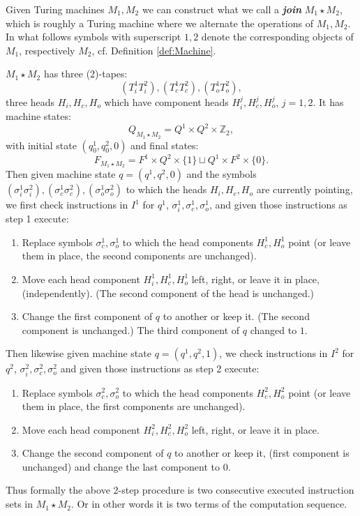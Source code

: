 \documentclass[9pt,twocolumn,twoside,lineno]{pnas-new}
\numberwithin{equation}{section}
\theoremstyle{definition}
\theoremstyle{remark}
\begin{document}
Given Turing machines $M _{1}, M _{2}  $ we can construct what we call a \textbf{\emph{join}} $M _{1} \star M _{2}  $, which is roughly  a Turing machine where we alternate the operations of $M _{1}, M  _{2}  $. In what follows symbols with superscript $1,2$ denote the corresponding objects of $M _{1} $, respectively $M _{2} $, cf. Definition \ref{def:Machine}. 
 

$M _{1} \star M _{2}  $ has three (2)-tapes: $$(T ^{{1} } _{i}  T ^{{2} } _{i}),    (T ^{{1} } _{c}  T ^{{2} } _{c}  ), (T ^{{1} } _{o}  T ^{2}  _{o} ),   $$ three heads $H _{i}, H _{c}, H _{o}   $ which have component heads $H ^{j} _{i}, H ^{j} _{c}, H ^{j} _{o}      $, $j=1,2$. It has machine states: $$Q _{M _{1} \star M _{2}  }   = Q ^{1} \times Q ^{2} \times \mathbb{Z}_{2},  $$ with initial state $(q _{0} ^{1}, q _{0} ^{2},0)$ and final states:
$$F _{M _{1} \star M _{2}  } = F ^{1} \times Q ^{2} \times \{1\} \sqcup Q ^{1} \times F ^{2} \times \{0\}.  $$
Then given machine state $q=(q ^{1}, q ^{2}, 0)$ and the symbols $(\sigma _{i} ^{1} \sigma _{i} ^{2}), (\sigma _{c} ^{1} \sigma _{c} ^{2}), (\sigma _{o} ^{1} \sigma _{o} ^{2})      $ to which the heads $H _{i}, H _{c}, H _{o}   $ are currently pointing, we first check instructions in $I ^{1} $ for $q ^{1} $, $ \sigma _{i} ^{1} ,  \sigma _{c} ^{1}, \sigma _{o} ^{1}    $, and given those instructions as step 1 execute:
\begin{enumerate}
 \item Replace symbols $\sigma ^{1}  _{c}, \sigma ^{1}  _{o}  $ to which the head components $H ^{1}  _{c}, H ^{1}  _{o}  $ point (or leave them in place, the second components are unchanged). 
 \item Move each head component $H ^{1}  _{i}, H ^{1}  _{c}, H ^{1}  _{o}   $ left, right, or leave it in place, (independently). (The second component of the head is unchanged.)
   \item Change the first component of $q$ to another or keep it. (The second component is unchanged.) The third component of $q$ changed to $1$.
\end{enumerate} 
Then likewise given machine state $q=(q ^{1}, q ^{2}, 1)$,  we check instructions in $I ^{2} $ for $q ^{2} $, $ \sigma _{i} ^{2} ,  \sigma _{c} ^{2}, \sigma _{o} ^{2}$ and given those instructions as step 2 execute:
\begin{enumerate}
 \item Replace symbols $\sigma ^{2}  _{c}, \sigma ^{2}  _{o}  $ to which the head components $H ^{2}  _{c}, H ^{2}  _{o}  $ point (or leave them in place, the first components are unchanged). 
   \item Move each head component $H ^{2}  _{i}, H ^{2}  _{c}, H ^{2}  _{o}   $ left, right, or leave it in place.
\item Change the second component of $q$ to another or keep it, (first component is unchanged) and change the last component to $0$.
\end{enumerate} 
Thus formally  the above 2-step procedure is two consecutive executed instruction sets in $M _{1} \star M _{2}  $. Or in other words it is two terms of the computation sequence.
\end{document}
